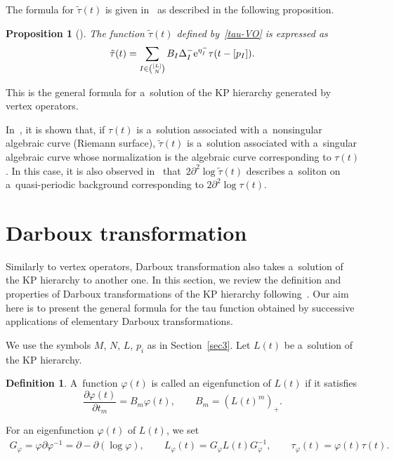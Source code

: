 \documentclass[pdftex]{sigma}
\numberwithin{equation}{section}
\newtheorem{Proposition}[Theorem]{Proposition}
\theoremstyle{definition}
\newtheorem{Definition}[Theorem]{Definition}
\begin{document}
The formula for $\tilde{\tau}(t)$ is given in~\cite{Nak2021,Nak2024} as described
in the following proposition.


\begin{Proposition}[{\cite{Nak2021,Nak2024}}]\label{VO-solution}
The function $\tilde{\tau}(t)$ defined by~\eqref{tau-VO} is expressed as
\begin{gather}
\tilde{\tau}(t)=\sum_{I\in \binom{[L]}{N}} B_I \Delta^{-}_I {\rm e}^{\eta_I^{-}}\tau(t-[p_I]).
\label{VO}
\end{gather}
\end{Proposition}

This is the general formula for a~solution of the KP hierarchy generated
by vertex operators.

In~\cite{Nak2024}, it is shown that, if $\tau(t)$ is a~solution associated with a~nonsingular algebraic curve (Riemann surface), $\tilde{\tau}(t)$ is a~solution associated with a~singular algebraic curve whose normalization is the algebraic curve corresponding to $\tau(t)$.
In this case,
it is also observed in~\cite{Nak2024} that~$2\partial^2\log \tilde{\tau}(t)$ describes a~soliton on a~quasi-periodic background corresponding to $2\partial^2\log \tau(t)$.

\section{Darboux transformation}\label{sec4}
Similarly to vertex operators, Darboux transformation also takes a~solution of the KP hierarchy to another one.
In this section, we review the definition and properties of Darboux transformations of the KP hierarchy following~\cite{H-van-de-Leur2001, Kakei}. Our aim here is to present the general formula for the tau
function obtained by successive applications of elementary Darboux transformations.

We use the symbols $M$, $N$, $L$, $p_i$ as in Section~\ref{sec3}.
Let $L(t)$ be a~solution of the KP hierarchy.

\begin{Definition} A~function $\varphi(t)$ is called an eigenfunction of $L(t)$ if it satisfies
\[%
\frac{\partial \varphi(t)}{\partial t_m}=B_m \varphi(t),
\qquad
B_m=(L(t)^m)_+.
\]
\end{Definition}


For an eigenfunction $\varphi(t)$ of $L(t)$, we set
\begin{gather*}
G_\varphi=\varphi\partial \varphi^{-1}=\partial-\partial (\log\varphi),
\qquad
L_\varphi(t)=G_\varphi L(t) G_{\varphi}^{-1},
\qquad
\tau_\varphi(t)=\varphi(t)\tau(t).
\end{gather*}
\end{document}
